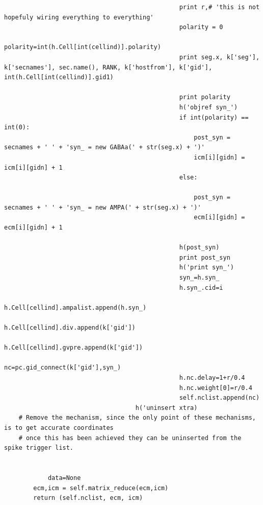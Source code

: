 \documentclass[a4paper,11pt]{article}
\begin{document}
\begin{verbatim}
                                                print r,# 'this is not hopefuly wiring everything to everything'
                                                polarity = 0        
                                                polarity=int(h.Cell[int(cellind)].polarity)
                                                print seg.x, k['seg'], k['secnames'], sec.name(), RANK, k['hostfrom'], k['gid'], int(h.Cell[int(cellind)].gid1)
                                                
                                                print polarity
                                                h('objref syn_')        
                                                if int(polarity) == int(0):
                                                    post_syn = secnames + ' ' + 'syn_ = new GABAa(' + str(seg.x) + ')'
                                                    icm[i][gidn] = icm[i][gidn] + 1
                                                else:
        
                                                    post_syn = secnames + ' ' + 'syn_ = new AMPA(' + str(seg.x) + ')'
                                                    ecm[i][gidn] = ecm[i][gidn] + 1
        
                                                h(post_syn)
                                                print post_syn
                                                h('print syn_')
                                                syn_=h.syn_
                                                h.syn_.cid=i
                                                h.Cell[cellind].ampalist.append(h.syn_)
                                                h.Cell[cellind].div.append(k['gid'])
                                                h.Cell[cellind].gvpre.append(k['gid'])
                                                nc=pc.gid_connect(k['gid'],syn_)                                        
                                                h.nc.delay=1+r/0.4
                                                h.nc.weight[0]=r/0.4    
                                                self.nclist.append(nc)
                                    h('uninsert xtra)                          
    # Remove the mechanism, since the only point of these mechanisms, is to get accurate coordinates
    # once this has been achieved they can be uninserted from the spike trigger list.
              
                                                        
            data=None                        
        ecm,icm = self.matrix_reduce(ecm,icm)
        return (self.nclist, ecm, icm)

\end{verbatim}
\end{document}
